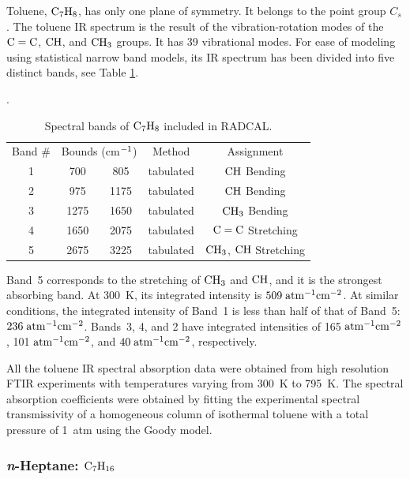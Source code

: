 Toluene, $\rm C_7H_8$, has only one plane of symmetry. It belongs to the point group $C_{s}$. The toluene IR spectrum is the result of the vibration-rotation modes of the $\rm C=C$, $\rm CH$, and $\rm CH_3$ groups. It has 39 vibrational modes. For ease of modeling using statistical narrow band models, its IR spectrum has been divided into five distinct bands, see Table \ref{Table::C7H8}.
\begin{table}[ht]
   \centering
   \caption{Spectral bands of $\rm C_7H_8$ included in RADCAL.}
   \vspace{0.1in}
   \label{Table::C7H8}.
   \begin{tabular}{|c|c|c|c|c|}
    \hline
    Band \# & \multicolumn{2}{|l|}{Bounds (cm$\rm ^{-1}$) } & Method & Assignment \\
    \cline{1-5}
    1 & 700  & 805  & tabulated &  $\rm CH$ Bending \\
    2 & 975  & 1175 & tabulated &  $\rm CH$ Bending \\
    3 & 1275 & 1650 & tabulated &  $\rm CH_3$ Bending \\
    4 & 1650 & 2075 & tabulated &  $\rm C=C$ Stretching \\
    5 & 2675 & 3225 & tabulated &  $\rm CH_3$, $\rm CH$  Stretching \\
    \hline
   \end{tabular}
\end{table}
Band~5 corresponds to the stretching of $\rm CH_3$ and $\rm CH$, and it is the strongest absorbing band. At 300~K, its integrated intensity is $509\;\rm {atm^{-1}cm^{-2}}$. At similar conditions, the integrated intensity of Band~1 is less than half of that of Band~5: $236\;\rm {atm^{-1}cm^{-2}}$. Bands~3, 4, and 2 have integrated intensities of 165$\;\rm {atm^{-1}cm^{-2}}$, 101$\;\rm {atm^{-1}cm^{-2}}$, and $40\;\rm {atm^{-1}cm^{-2}}$, respectively.

All the toluene IR spectral absorption data were obtained from high resolution FTIR experiments with temperatures varying from 300~K to 795~K. The spectral absorption coefficients were obtained by fitting the experimental spectral transmissivity of a homogeneous column of isothermal toluene with a total pressure of 1~atm using the Goody model.

\subsubsection{\textit{n}-Heptane: $\rm C_7H_{16}$}

